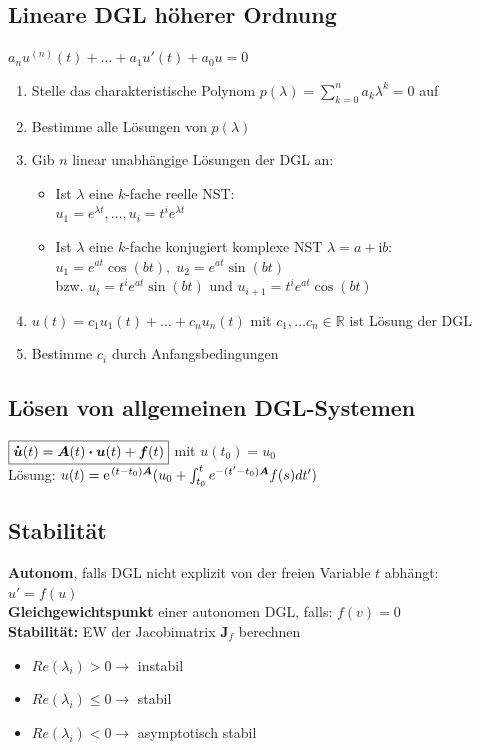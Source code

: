 \documentclass[6pt,a4paper]{scrartcl}
\newcommand{\ma}[1]{\ensuremath{\boldsymbol {#1}}}												%
\newcommand{\bdot}{\ensuremath{\boldsymbol \cdot}} 												%
\renewcommand{\vec}[1]{\ensuremath{\boldsymbol {#1}}}											%
\renewcommand*{\dot}[1]{\accentset{\mbox{\textrm{\large\bfseries .}} }{#1}}						%
\newcommand{\ra}[0]{\ensuremath{\rightarrow}} 									%
\renewcommand{\i}{\ensuremath{\mathrm{i}}}										%
\newcommand{\R}{\ensuremath{\mathbb R}}
\begin{document}
\begin{multicols*}{4}
\subsection{Lineare DGL höherer Ordnung}
$\boxed{a_nu^{(n)}(t) + \hdots + a_1u'(t)+a_0u = 0}$\\
\begin{enumerate}\itemsep0pt 
	\item Stelle das charakteristische Polynom $p(\lambda) = \sum^n_{k=0} a_k \lambda^k = 0$ auf
	\item Bestimme alle Lösungen von $p(\lambda)$
	\item Gib $n$ linear unabhängige Lösungen der DGL an:
	\begin{itemize}\itemsep0pt 
		\item 	Ist $ \lambda$ eine $k$-fache reelle NST:\\
$u_1 = e^{\lambda t}, \hdots, u_i = t^i e^{ \lambda t}$\\
		\item Ist $ \lambda$ eine $k$-fache konjugiert komplexe NST $\lambda = a + \i b$:\\
$u_1 = e^{at} \cos (bt),\; u_2 = e^{at} \sin (bt)$ \\
bzw. $u_i = t^i e^{at} \sin (bt)$ und $u_{i+1} =  t^i e^{at} \cos (bt)$
	\end{itemize}
	\item $u(t) = c_1 u_1 (t) + \ldots + c_n u_n (t)$ mit $c_1, \ldots c_n \in \R$ ist Lösung der DGL
	\item Bestimme $c_i$ durch Anfangsbedingungen
\end{enumerate}

\subsection{Lösen von allgemeinen DGL-Systemen}
$\boxed{\dot {\vec u}(t) = \ma A(t) \bdot \vec u(t) + \vec f(t)}$ mit $u(t_0) = u_0$\\
Lösung: $u(t) = \e^{(t-t_0)\ma A}(u_0 + \int_{t_0}^t e^{-(t'-t_0)\ma A}f(s)dt')$\\
\subsection{Stabilität}
\textbf{Autonom}, falls DGL nicht explizit von der freien Variable $t$ abhängt: $u'=f(u)$\\
\textbf{Gleichgewichtspunkt} einer autonomen DGL, falls: $f(v) = 0$\\
\textbf{Stabilität:} EW der Jacobimatrix $\ma J_f$ berechnen
\begin{itemize}\itemsep-1pt
	\item $Re(\lambda_i) > 0 \ra$ instabil
	\item $Re(\lambda_i) \le 0 \ra$ stabil
	\item $Re(\lambda_i) < 0 \ra$ asymptotisch stabil 
\end{itemize}


\end{multicols*}
\end{document}
